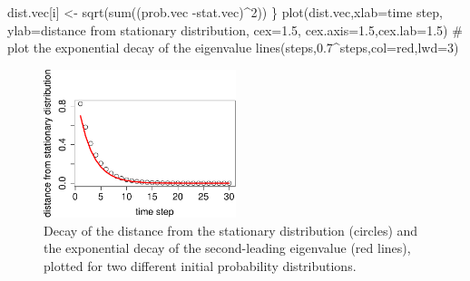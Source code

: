 \documentclass[
  letterpaper,
  DIV=11,
  numbers=noendperiod]{scrreprt}
\newenvironment{Shaded}{\begin{snugshade}}{\end{snugshade}}
\newcommand{\AttributeTok}[1]{\textcolor[rgb]{0.40,0.45,0.13}{#1}}
\newcommand{\CommentTok}[1]{\textcolor[rgb]{0.37,0.37,0.37}{#1}}
\newcommand{\DecValTok}[1]{\textcolor[rgb]{0.68,0.00,0.00}{#1}}
\newcommand{\FloatTok}[1]{\textcolor[rgb]{0.68,0.00,0.00}{#1}}
\newcommand{\FunctionTok}[1]{\textcolor[rgb]{0.28,0.35,0.67}{#1}}
\newcommand{\NormalTok}[1]{\textcolor[rgb]{0.00,0.23,0.31}{#1}}
\newcommand{\OtherTok}[1]{\textcolor[rgb]{0.00,0.23,0.31}{#1}}
\newcommand{\SpecialCharTok}[1]{\textcolor[rgb]{0.37,0.37,0.37}{#1}}
\newcommand{\StringTok}[1]{\textcolor[rgb]{0.13,0.47,0.30}{#1}}
\begin{document}
\begin{Shaded}
\begin{Highlighting}[]
\NormalTok{  dist.vec[i] }\OtherTok{\textless{}{-}} \FunctionTok{sqrt}\NormalTok{(}\FunctionTok{sum}\NormalTok{((prob.vec }\SpecialCharTok{{-}}\NormalTok{stat.vec)}\SpecialCharTok{\^{}}\DecValTok{2}\NormalTok{))}
\NormalTok{\}}
\FunctionTok{plot}\NormalTok{(dist.vec,}\AttributeTok{xlab=}\StringTok{\textquotesingle{}time step\textquotesingle{}}\NormalTok{, }\AttributeTok{ylab=}\StringTok{\textquotesingle{}distance from stationary distribution\textquotesingle{}}\NormalTok{, }\AttributeTok{cex=}\FloatTok{1.5}\NormalTok{, }\AttributeTok{cex.axis=}\FloatTok{1.5}\NormalTok{,}\AttributeTok{cex.lab=}\FloatTok{1.5}\NormalTok{)}
 \CommentTok{\# plot the exponential decay of the eigenvalue}
\FunctionTok{lines}\NormalTok{(steps,}\FloatTok{0.7}\SpecialCharTok{\^{}}\NormalTok{steps,}\AttributeTok{col=}\StringTok{\textquotesingle{}red\textquotesingle{}}\NormalTok{,}\AttributeTok{lwd=}\DecValTok{3}\NormalTok{)}
\end{Highlighting}
\end{Shaded}

\begin{figure}[H]

{\centering \includegraphics[width=0.5\textwidth,height=\textheight]{./markov_eigen_files/figure-pdf/comp13-5-1.pdf}

}

\caption{Decay of the distance from the stationary distribution
(circles) and the exponential decay of the second-leading eigenvalue
(red lines), plotted for two different initial probability
distributions.}

\end{figure}
\end{document}
